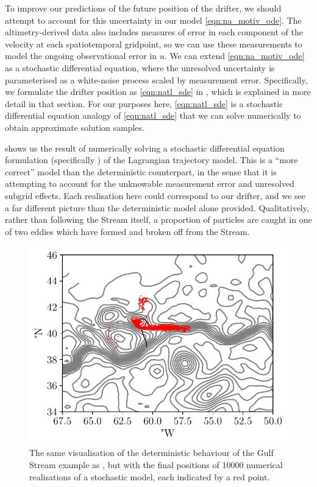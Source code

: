 To improve our predictions of the future position of the drifter, we should attempt to account for this uncertainty in our model \cref{eqn:na_motiv_ode}.
The altimetry-derived data also includes measures of error in each component of the velocity at each spatiotemporal gridpoint, so we can use these measurements to model the ongoing observational error in \(u\).
We can extend \cref{eqn:na_motiv_ode} as a stochastic differential equation, where the unresolved uncertainty is parameterised as a white-noise process scaled by measurement error.
Specifically, we formulate the drifter position as \cref{eqn:natl_sde} in , which is explained in more detail in that section.
For our purposes here, \cref{eqn:natl_sde} is a stochastic differential equation analogy of \cref{eqn:natl_sde} that we can solve numerically to obtain approximate solution samples.

 shows us the result of numerically solving a stochastic differential equation formulation (specifically ) of the Lagrangian trajectory model.
This is a ``more correct'' model than the deterministic counterpart, in the sense that it is attempting to account for the unknowable measurement error and unresolved subgrid effects.
Each realisation here could correspond to our drifter, and we see a far different picture than the deterministic model alone provided.
Qualitatively, rather than following the Stream itself, a proportion of particles are caught in one of two eddies which have formed and broken off from the Stream.

\begin{figure}
	\begin{center}
		\includegraphics[width=\textwidth]{chp06_applications/figures/gulf_stream_motivation/num_rels.pdf}
		\caption{The same visualisation of the deterministic behaviour of the Gulf Stream example as , but with the final positions of 10000 numerical realisations of a stochastic model, each indicated by a red point.}
		\label{fig:na_motiv_rels}
	\end{center}
\end{figure}

